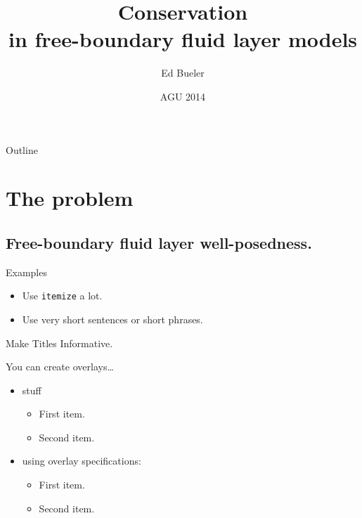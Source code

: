 \documentclass{beamer}
\title[Conservation in free-boundary layers] %
{Conservation \\ in free-boundary fluid layer models}
\author{Ed Bueler}
\institute[UAF] %
{
  Dept of Mathematics and Statistics, and Geophysical Institute\\
  University of Alaska Fairbanks%
}
\date{{\scriptsize AGU 2014}}
\begin{document}
\begin{frame}
  \titlepage
\end{frame}

\begin{frame}{Outline}
  \tableofcontents
\end{frame}





\section{The problem}

\subsection{Free-boundary fluid layer well-posedness.}


\begin{frame}{Examples}

  \begin{itemize}
  \item
    Use \texttt{itemize} a lot.
  \item
    Use very short sentences or short phrases.
  \end{itemize}
\end{frame}


\begin{frame}{Make Titles Informative.}

  You can create overlays\dots
  \begin{itemize}
  \item stuff
    \begin{itemize}
    \item
      First item.
    \item    
      Second item.
    \end{itemize}
  \item
    using overlay specifications:
    \begin{itemize}
    \item<2->
      First item.
    \item<3->
      Second item.
    \end{itemize}
  \end{itemize}
\end{frame}
\end{document}
